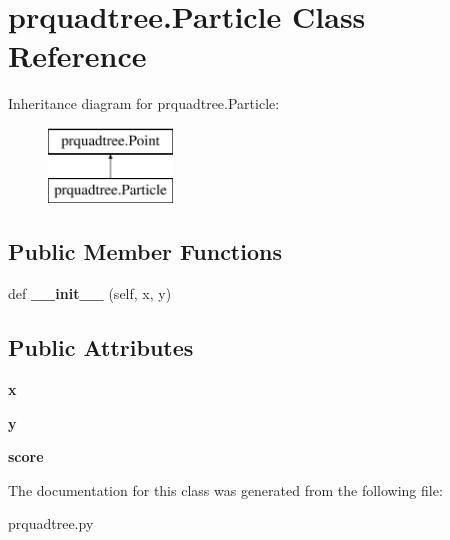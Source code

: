 \hypertarget{classprquadtree_1_1Particle}{}\section{prquadtree.\+Particle Class Reference}
\label{classprquadtree_1_1Particle}
Inheritance diagram for prquadtree.\+Particle\+:\begin{figure}[H]
\begin{center}
\leavevmode
\includegraphics[height=2.000000cm]{classprquadtree_1_1Particle}
\end{center}
\end{figure}
\subsection*{Public Member Functions}
\begin{DoxyCompactItemize}
\item 
\hypertarget{classprquadtree_1_1Particle_a4508876870d2813145a26fb581ce06f4}{}def {\bfseries \+\_\+\+\_\+init\+\_\+\+\_\+} (self, x, y)\label{classprquadtree_1_1Particle_a4508876870d2813145a26fb581ce06f4}

\end{DoxyCompactItemize}
\subsection*{Public Attributes}
\begin{DoxyCompactItemize}
\item 
\hypertarget{classprquadtree_1_1Particle_a749ee47de3358225c48e7b8d4dc85ded}{}{\bfseries x}\label{classprquadtree_1_1Particle_a749ee47de3358225c48e7b8d4dc85ded}

\item 
\hypertarget{classprquadtree_1_1Particle_ab4bcb8c94d6976d2050749590ad41210}{}{\bfseries y}\label{classprquadtree_1_1Particle_ab4bcb8c94d6976d2050749590ad41210}

\item 
\hypertarget{classprquadtree_1_1Particle_a9fc6fbbd51a3dc21b0dc2531c6c6ff1b}{}{\bfseries score}\label{classprquadtree_1_1Particle_a9fc6fbbd51a3dc21b0dc2531c6c6ff1b}

\end{DoxyCompactItemize}


The documentation for this class was generated from the following file\+:\begin{DoxyCompactItemize}
\item 
prquadtree.\+py\end{DoxyCompactItemize}
